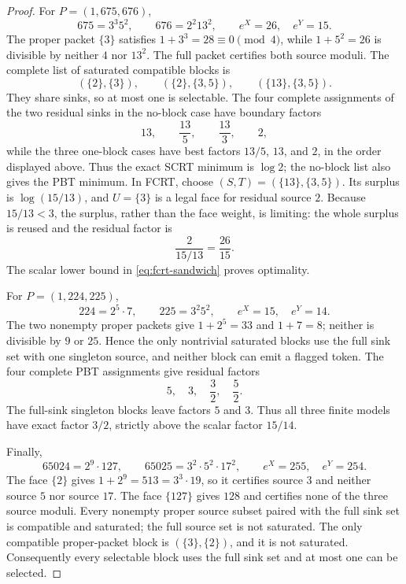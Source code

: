 \begin{proof}
For $P=(1,675,676)$,
\[
 675=3^3 5^2,\qquad676=2^2 13^2,\qquad
 e^X=26,\quad e^Y=15.
\]
The proper packet $\{3\}$ satisfies
$1+3^3=28\equiv0\pmod4$, while $1+5^2=26$ is divisible by neither $4$ nor
$13^2$.  The full packet certifies both source moduli.  The complete list of
saturated compatible blocks is
\[
 (\{2\},\{3\}),\qquad(\{2\},\{3,5\}),\qquad
 (\{13\},\{3,5\}).
\]
They share sinks, so at most one is selectable.  The four complete
assignments of the two residual sinks in the no-block case have boundary
factors
\[
                         13,\qquad\frac{13}{5},\qquad
                         \frac{13}{3},\qquad2,
\]
while the three one-block cases have best factors
$13/5$, $13$, and $2$, in the order displayed above.  Thus the exact SCRT
minimum is $\log2$; the no-block list also gives the PBT minimum.  In FCRT,
choose
$(S,T)=(\{13\},\{3,5\})$.  Its surplus is
$\log(15/13)$, and $U=\{3\}$ is a legal face for residual source $2$.
Because $15/13<3$, the surplus, rather than the face weight, is limiting:
the whole surplus is reused and the residual factor is
\[
                         \frac{2}{15/13}=\frac{26}{15}.
\]
The scalar lower bound in \eqref{eq:fcrt-sandwich} proves optimality.

For $P=(1,224,225)$,
\[
 224=2^5\cdot7,\qquad225=3^2 5^2,\qquad
 e^X=15,\quad e^Y=14.
\]
The two nonempty proper packets give $1+2^5=33$ and $1+7=8$; neither is
divisible by $9$ or $25$.  Hence the only nontrivial saturated blocks use
the full sink set with one singleton source, and neither block can emit a
flagged token.  The four complete PBT assignments give residual factors
\[
                         5,\quad3,\quad\frac32,\quad\frac52.
\]
The full-sink singleton blocks leave factors $5$ and $3$.  Thus all three
finite models have exact factor $3/2$, strictly above the scalar factor
$15/14$.

Finally,
\[
 65024=2^9\cdot127,\qquad
 65025=3^2\cdot5^2\cdot17^2,\qquad
 e^X=255,\quad e^Y=254.
\]
The face $\{2\}$ gives
$1+2^9=513=3^3\cdot19$, so it certifies source $3$ and neither source $5$
nor source $17$.  The face $\{127\}$ gives $128$ and certifies none of the
three source moduli.  Every nonempty proper source subset paired with the
full sink set is compatible and saturated; the full source set is not
saturated.  The only compatible proper-packet block is
$(\{3\},\{2\})$, and it is not saturated.  Consequently every selectable
block uses the full sink set and at most one can be selected.


\end{proof}
